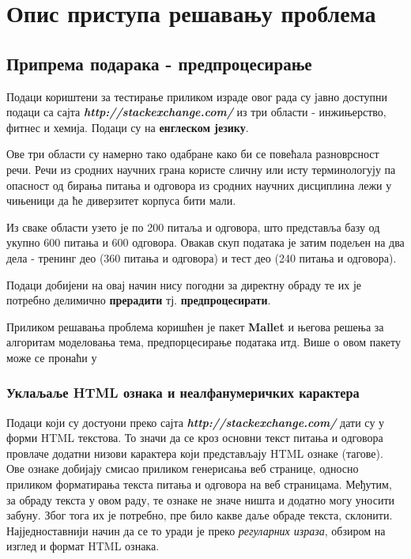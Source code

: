 \chapter{Опис приступа решавању проблема}

\section{Припрема подарака - предпроцесирање}

Подаци  кориштени за тестирање приликом израде овог рада су јавно доступни подаци са сајта \textbf{\textit{http://stackexchange.com/}} из три области  - инжињерство, фитнес и хемија. Подаци су на \textbf{енглеском језику}. 

Ове три области су намерно тако одабране како би се повећала разноврсност речи. Речи из сродних научних грана користе сличну или исту терминологују па опасност од бирања питања и одговора из  сродних научних дисциплина лежи у чињеници да ће диверзитет корпуса бити мали.

Из сваке области узето је по 200 питаља и одговора, што представља базу од укупно 600 питања и 600 одговора. Овакав скуп података је затим подељен на два дела - тренинг део (360 питања и одговора) и тест део (240 питања и одговора).

Подаци добијени на овај начин нису погодни за директну обраду те их је потребно делимично \textbf{прерадити} тј. \textbf{предпроцесирати}. 

Приликом решавања проблема коришћен  је пакет \textbf{Mallet} и његова решења за алгоритам моделовања тема, предпорцесирање података итд.  Више о овом пакету може се пронаћи у \cite{tm1}


	\subsection{Уклаљаље HTML ознака и неалфанумеричких карактера }
	
Подаци који су достуони преко сајта \textbf{\textit{http://stackexchange.com/}} дати су у форми HTML текстова. То значи да се кроз основни текст питања и одговора провлаче додатни низови карактера који представљају HTML ознаке (тагове). Ове ознаке добијају смисао приликом генерисања веб странице, односно приликом форматирања текста питања и одговора на веб страницама. Међутим, за обраду текста у овом раду, те ознаке не значе ништа и додатно могу уносити забуну. Због тога их је потребно, пре било какве даље обраде текста, склонити. Најједноставнији начин да се то уради је преко \textit{регуларних израза}, обзиром на изглед и формат HTML ознака.


